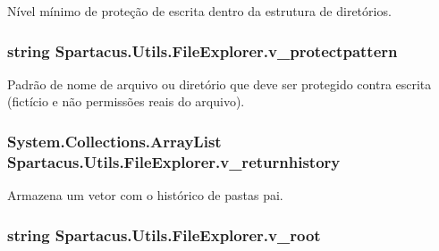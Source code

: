 Nível mínimo de proteção de escrita dentro da estrutura de diretórios. 

\hypertarget{classSpartacus_1_1Utils_1_1FileExplorer_a1e0f31dd0c66b2a6d5003a0ace555eab}{
\subsubsection[{v\+\_\+protectpattern}]{\setlength{\rightskip}{0pt plus 5cm}string Spartacus.\+Utils.\+File\+Explorer.\+v\+\_\+protectpattern}}\label{classSpartacus_1_1Utils_1_1FileExplorer_a1e0f31dd0c66b2a6d5003a0ace555eab}


Padrão de nome de arquivo ou diretório que deve ser protegido contra escrita (fictício e não permissões reais do arquivo). 

\hypertarget{classSpartacus_1_1Utils_1_1FileExplorer_a0b1ce7d97438abd5824a0b6b9b99bc34}{
\subsubsection[{v\+\_\+returnhistory}]{\setlength{\rightskip}{0pt plus 5cm}System.\+Collections.\+Array\+List Spartacus.\+Utils.\+File\+Explorer.\+v\+\_\+returnhistory}}\label{classSpartacus_1_1Utils_1_1FileExplorer_a0b1ce7d97438abd5824a0b6b9b99bc34}


Armazena um vetor com o histórico de pastas pai. 

\hypertarget{classSpartacus_1_1Utils_1_1FileExplorer_a398279cbdbce816d3c0d40b3dc02eb50}{
\subsubsection[{v\+\_\+root}]{\setlength{\rightskip}{0pt plus 5cm}string Spartacus.\+Utils.\+File\+Explorer.\+v\+\_\+root}}\label{classSpartacus_1_1Utils_1_1FileExplorer_a398279cbdbce816d3c0d40b3dc02eb50}


